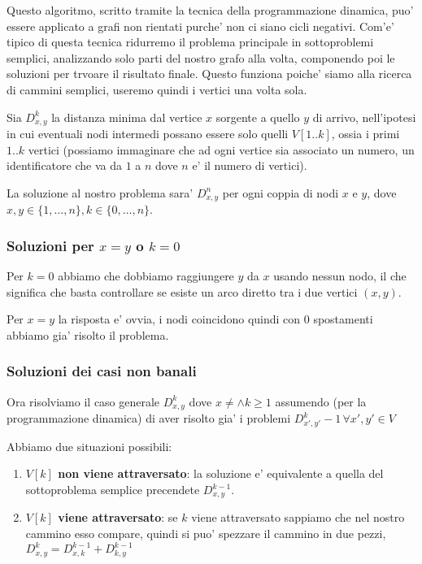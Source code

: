 \documentclass{article}
\begin{document}
Questo algoritmo, scritto tramite la tecnica della programmazione dinamica, puo'
essere applicato a grafi non rientati purche' non ci siano cicli negativi.
Com'e' tipico di questa tecnica ridurremo il problema principale in sottoproblemi
semplici, analizzando solo parti del nostro grafo alla volta, componendo poi le
soluzioni per trvoare il risultato finale. Questo funziona poiche' siamo alla
ricerca di cammini semplici, useremo quindi i vertici una volta sola.

Sia $D_{x,y}^k$ la distanza minima dal vertice $x$ sorgente a quello $y$ di arrivo,
nell'ipotesi in cui eventuali nodi intermedi possano essere solo quelli $V[1..k]$,
ossia i primi $1..k$ vertici (possiamo immaginare che ad ogni vertice sia associato
un numero, un identificatore che va da $1$ a $n$ dove $n$ e' il numero di vertici).

La soluzione al nostro problema sara' $D_{x,y}^n$ per ogni coppia di nodi $x$ e $y$,
dove $x,y \in \{1,\ldots,n\}, k \in \{0,\ldots,n\}$.

\subsubsection{Soluzioni per $x=y$ o $k=0$}

Per $k=0$ abbiamo che dobbiamo raggiungere $y$ da $x$ usando nessun nodo, il che
significa che basta controllare se esiste un arco diretto tra i due vertici $(x,y)$.

Per $x=y$ la risposta e' ovvia, i nodi coincidono quindi con $0$ spostamenti
abbiamo gia' risolto il problema.

\subsubsection{Soluzioni dei casi non banali}

Ora risolviamo il caso generale $D_{x,y}^k$ dove $x\neq \wedge k\geq1$ assumendo
(per la programmazione dinamica) di aver risolto gia' i problemi $D_{x',y'}^k-1
\, \forall x',y' \in V$

\noindent Abbiamo due situazioni possibili:
\begin{enumerate}
  \item \textbf{$V[k]$ non viene attraversato}: la soluzione e' equivalente a 
    quella del sottoproblema semplice precendete $D_{x,y}^{k-1}$.
  \item \textbf{$V[k]$ viene attraversato}: se $k$ viene attraversato sappiamo che
    nel nostro cammino esso compare, quindi si puo' spezzare il cammino in due pezzi,
    $D_{x,y}^{k} = D_{x,k}^{k-1} + D_{k,y}^{k-1}$
\end{enumerate}
\end{document}
